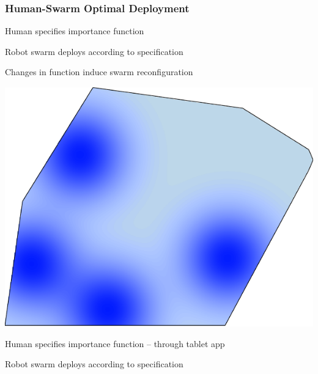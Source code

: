 \documentclass[10pt]{beamer}
\begin{document}
\begin{frame}
  \frametitle{Human-Swarm Optimal Deployment}

  \begin{overprint}

  \begin{minipage}{.625\linewidth}
    \alert{Human} specifies importance function\newline \null \mbox{}
    \hfill \phantom{-- through tablet app}

    \bigskip
    
    \alert{Robot swarm} deploys according to specification

    \bigskip

    Changes in function induce swarm reconfiguration
  \end{minipage}
  \hfill
  \begin{minipage}{.315\linewidth}
    {\includegraphics[width=.775\linewidth]{phicontourplot-nicest}}
  \end{minipage}


  \begin{minipage}{.625\linewidth}
    \alert{Human} specifies importance function\newline
    \null \mbox{} \hfill -- through tablet app

    \bigskip
    
    \alert{Robot swarm} deploys according to specification

    \bigskip


\end{minipage}
\end{overprint}
\end{frame}
\end{document}
